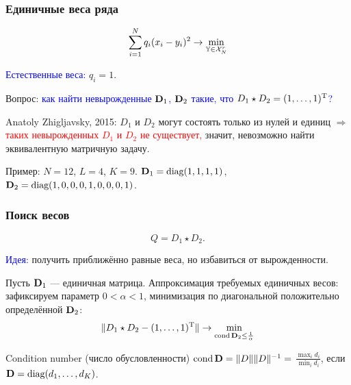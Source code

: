 \documentclass[unicode, notheorems]{beamer}
\DeclareMathOperator{\cond}{cond}
\begin{document}
\begin{frame}
	\frametitle{Единичные веса ряда}
	\vspace{-0.3cm}
	\begin{equation*}
	\sum \limits_{i=1}^N q_i(x_i - y_i)^2 \to \min_{\mathbb{Y} \in \mathcal{X}_N^r}
	\end{equation*}
	
    \textcolor{blue}{Естественные веса:} $q_i = 1$.
	
	\vspace{0.3cm}
	
	Вопрос: \textcolor{blue}{как найти невырожденные $\mathbf{D}_1$, $\mathbf{D}_2$ такие, что $D_1 \star D_2 = (1, \ldots, 1)^{\mathrm{T}}$?}
	
	Anatoly Zhigljavsky, 2015: $D_1$ и $D_2$ могут состоять только из нулей и единиц $\Rightarrow$ \textcolor{red}{таких невырожденных $D_1$ и $D_2$ не существует,} значит, невозможно найти эквивалентную матричную задачу.
	
	\vspace{0.4cm}
	Пример: $N = 12$, $L = 4$, $K = 9$. $\mathbf{D}_1 = \text{diag}(1, 1, 1, 1)$, 
	$\mathbf{D}_2 = \text{diag}(1, 0, 0, 0, 1, 0, 0, 0, 1)$.
\end{frame}

\begin{frame}
	\frametitle{Поиск весов}
	\begin{equation*}
	Q = D_1 \star D_2.
	\end{equation*}
	
	\textcolor{blue}{Идея:} получить приближённо равные веса, но избавиться от вырожденности. 
	
	Пусть $\mathbf{D}_1$ --- единичная матрица. Аппроксимация требуемых единичных весов: зафиксируем параметр $0 < \alpha < 1$, минимизация по диагональной положительно определённой $\mathbf{D}_2$:
	\begin{equation*}
	\|D_1 \star D_2 - (1, \ldots, 1)^\rmT\| \to \min_{\cond \bfD_2 \le \frac{1}{\alpha}}
	\end{equation*}
	
	\vspace{0.2cm}
	Condition number (число обусловленности) $\cond \bfD = \|D\| \|D\|^{-1} = $ $\frac{\max_i d_i}{\min_i d_i}$, если $\mathbf{D} = \text{diag}(d_1, \ldots, d_K)$.
\end{frame}
\end{document}
